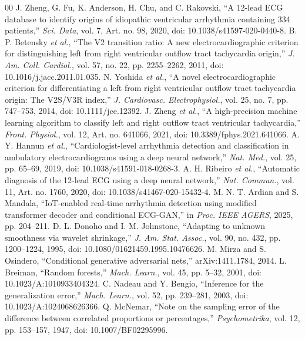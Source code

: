 \documentclass[conference,a4paper]{IEEEtran}
\begin{document}
\balance
\begin{thebibliography}{00}
 J. Zheng, G. Fu, K. Anderson, H. Chu, and C. Rakovski, ``A 12-lead ECG database to identify origins of idiopathic ventricular arrhythmia containing 334 patients,'' \emph{Sci. Data}, vol. 7, Art. no. 98, 2020, doi: 10.1038/s41597-020-0440-8.
 B. P. Betensky \emph{et al.}, ``The V2 transition ratio: A new electrocardiographic criterion for distinguishing left from right ventricular outflow tract tachycardia origin,'' \emph{J. Am. Coll. Cardiol.}, vol. 57, no. 22, pp. 2255--2262, 2011, doi: 10.1016/j.jacc.2011.01.035.
 N. Yoshida \emph{et al.}, ``A novel electrocardiographic criterion for differentiating a left from right ventricular outflow tract tachycardia origin: The V2S/V3R index,'' \emph{J. Cardiovasc. Electrophysiol.}, vol. 25, no. 7, pp. 747--753, 2014, doi: 10.1111/jce.12392.
 J. Zheng \emph{et al.}, ``A high-precision machine learning algorithm to classify left and right outflow tract ventricular tachycardia,'' \emph{Front. Physiol.}, vol. 12, Art. no. 641066, 2021, doi: 10.3389/fphys.2021.641066.
 A. Y. Hannun \emph{et al.}, ``Cardiologist-level arrhythmia detection and classification in ambulatory electrocardiograms using a deep neural network,'' \emph{Nat. Med.}, vol. 25, pp. 65--69, 2019, doi: 10.1038/s41591-018-0268-3.
 A. H. Ribeiro \emph{et al.}, ``Automatic diagnosis of the 12-lead ECG using a deep neural network,'' \emph{Nat. Commun.}, vol. 11, Art. no. 1760, 2020, doi: 10.1038/s41467-020-15432-4.
 M. N. T. Ardian and S. Mandala, ``IoT-enabled real-time arrhythmia detection using modified transformer decoder and conditional ECG-GAN,'' in \emph{Proc. IEEE AGERS}, 2025, pp. 204--211.
 D. L. Donoho and I. M. Johnstone, ``Adapting to unknown smoothness via wavelet shrinkage,'' \emph{J. Am. Stat. Assoc.}, vol. 90, no. 432, pp. 1200--1224, 1995, doi: 10.1080/01621459.1995.10476626.
 M. Mirza and S. Osindero, ``Conditional generative adversarial nets,'' arXiv:1411.1784, 2014.
 L. Breiman, ``Random forests,'' \emph{Mach. Learn.}, vol. 45, pp. 5--32, 2001, doi: 10.1023/A:1010933404324.
 C. Nadeau and Y. Bengio, ``Inference for the generalization error,'' \emph{Mach. Learn.}, vol. 52, pp. 239--281, 2003, doi: 10.1023/A:1024068626366.
 Q. McNemar, ``Note on the sampling error of the difference between correlated proportions or percentages,'' \emph{Psychometrika}, vol. 12, pp. 153--157, 1947, doi: 10.1007/BF02295996.

\end{thebibliography}
\end{document}
